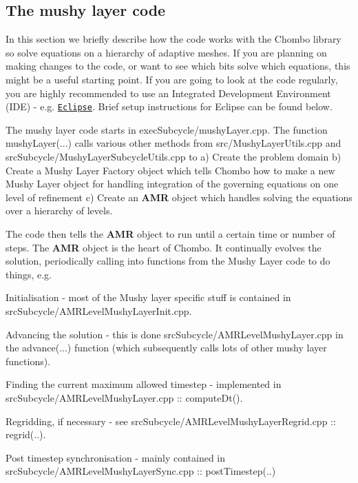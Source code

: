 \subsection*{The mushy layer code}

In this section we briefly describe how the code works with the Chombo library so solve equations on a hierarchy of adaptive meshes. If you are planning on making changes to the code, or want to see which bits solve which equations, this might be a useful starting point. If you are going to look at the code regularly, you are highly recommended to use an Integrated Development Environment (I\+DE) -\/ e.\+g. \href{https://www.eclipse.org/downloads/packages/release/2018-12/r/eclipse-ide-cc-developers}{\tt Eclipse}. Brief setup instructions for Eclipse can be found below.

The mushy layer code starts in {\ttfamily exec\+Subcycle/mushy\+Layer.\+cpp}. The function {\ttfamily mushy\+Layer(...)} calls various other methods from {\ttfamily src/\+Mushy\+Layer\+Utils.\+cpp} and {\ttfamily src\+Subcycle/\+Mushy\+Layer\+Subcycle\+Utils.\+cpp} to a) Create the problem domain b) Create a \textquotesingle{}Mushy Layer Factory\textquotesingle{} object which tells Chombo how to make a new Mushy Layer object for handling integration of the governing equations on one level of refinement c) Create an {\ttfamily \textbf{ A\+MR}} object which handles solving the equations over a hierarchy of levels.

The code then tells the \textbf{ A\+MR} object to run until a certain time or number of steps. The \textbf{ A\+MR} object is the heart of Chombo. It continually evolves the solution, periodically calling into functions from the Mushy Layer code to do things, e.\+g.


\begin{DoxyItemize}
\item Initialisation -\/ most of the Mushy layer specific stuff is contained in {\ttfamily src\+Subcycle/\+A\+M\+R\+Level\+Mushy\+Layer\+Init.\+cpp}.
\item Advancing the solution -\/ this is done {\ttfamily src\+Subcycle/\+A\+M\+R\+Level\+Mushy\+Layer.\+cpp} in the {\ttfamily advance(...)} function (which subsequently calls lots of other mushy layer functions).
\item Finding the current maximum allowed timestep -\/ implemented in {\ttfamily src\+Subcycle/\+A\+M\+R\+Level\+Mushy\+Layer.\+cpp \+:\+: compute\+Dt()}.
\item Regridding, if necessary -\/ see {\ttfamily src\+Subcycle/\+A\+M\+R\+Level\+Mushy\+Layer\+Regrid.\+cpp \+:\+: regrid(..)}.
\item Post timestep synchronisation -\/ mainly contained in {\ttfamily src\+Subcycle/\+A\+M\+R\+Level\+Mushy\+Layer\+Sync.\+cpp \+:\+: post\+Timestep(..)}
\end{DoxyItemize}

